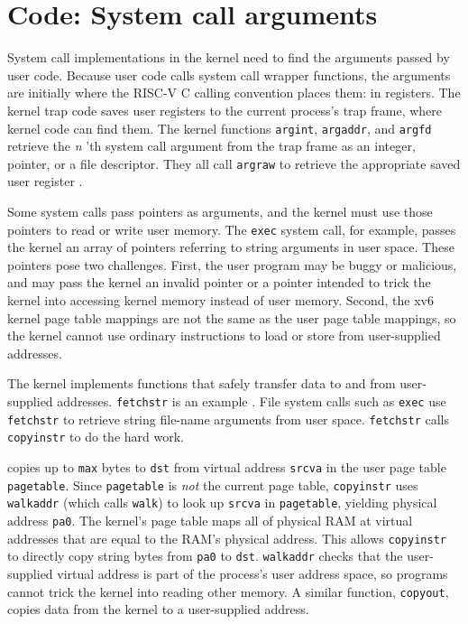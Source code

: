 \section{Code: System call arguments}

System call implementations in the kernel need to find the arguments
passed by user code. Because user code calls system call wrapper
functions, the arguments are initially where the RISC-V C calling
convention places them: in registers.
The kernel trap code saves user registers to the current
process's trap frame, where kernel code can find them.
The kernel functions
\lstinline{argint},
\lstinline{argaddr},
and
\lstinline{argfd}
retrieve the 
\textit{n} 'th 
system call argument
from the trap frame
as an integer, pointer, or a file descriptor.
They all call {\tt argraw} to retrieve the appropriate saved
user register
.

Some system calls pass pointers as arguments, and the kernel must use
those pointers to read or write user memory. The {\tt exec} system
call, for example, passes the kernel an array of pointers
referring to string arguments in user space.
These pointers pose
two challenges. First, the user program may be buggy or malicious, and
may pass the kernel an invalid pointer or a pointer intended to trick
the kernel into accessing kernel memory instead of user memory.
Second, the xv6 kernel page table mappings are not the same as the
user page table mappings, so the kernel cannot use ordinary
instructions to load or store from user-supplied addresses.

The kernel implements functions that safely transfer data to and
from user-supplied addresses.
{\tt fetchstr} is an example .
File system calls such as
{\tt exec} use {\tt fetchstr} to retrieve string file-name arguments from user
space.
\lstinline{fetchstr} calls \lstinline{copyinstr}
to do the hard work.

 copies up to \lstinline{max} bytes to
\lstinline{dst} from virtual address \lstinline{srcva} in the user page
table \lstinline{pagetable}.
Since \lstinline{pagetable} is {\it not} the current page
table,
\lstinline{copyinstr} uses {\tt walkaddr}
(which calls {\tt walk}) to look up
\lstinline{srcva} in
\lstinline{pagetable}, yielding
physical address \lstinline{pa0}.
The kernel's page table maps all of physical RAM 
at virtual addresses that are equal to the RAM's physical address.
This allows
{\tt copyinstr} to directly copy string bytes from {\tt pa0} to {\tt dst}.
{\tt walkaddr} 
checks that the user-supplied virtual address is part of
the process's user address space, so programs
cannot trick the kernel into reading other memory.
A similar function, {\tt copyout}, copies data from the
kernel to a user-supplied address.

